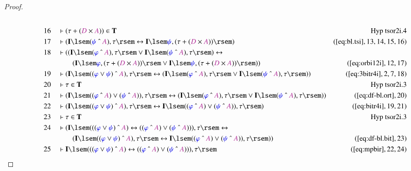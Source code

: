 \begin{proof}
\begin{align}
  \\ 16 &&  & \vdash ( \tau + ( \mc{D} \times \mc{A} ) ) \in
      \mathbf{T}&\text{Hyp~tsor2i.4}\notag%
  \\ 17 &&  & \vdash ( \mathbf{I} \lsem ( \mw{\psi} ~\string^~ \mc{A} ) , \tau
      \rsem \leftrightarrow \mathbf{I} \lsem \mw{\psi} , (
      \tau + ( \mc{D} \times \mc{A} ) ) \rsem
      )&(\mbox{\ref{eq:bl.tsi}},13,14,15,16)\notag
  \\ 18 &&  & \vdash ( ( \mathbf{I} \lsem ( \mw{\varphi} ~\string^~ \mc{A} ) ,
      \tau \rsem \vee \mathbf{I} \lsem ( \mw{\psi}
      ~\string^~ \mc{A} ) , \tau \rsem ) \leftrightarrow  \notag \\ & & & \qquad
     (
      \mathbf{I} \lsem \mw{\varphi} , ( \tau + ( \mc{D}
      \times \mc{A} ) ) \rsem \vee \mathbf{I} \lsem
      \mw{\psi} , ( \tau + ( \mc{D} \times \mc{A} ) ) \rsem
      ) )&(\mbox{\ref{eq:orbi12i}},12,17)\notag
  \\ 19 &&  & \vdash ( \mathbf{I} \lsem ( ( \mw{\varphi} \vee \mw{\psi} )
      ~\string^~ \mc{A} ) , \tau \rsem \leftrightarrow (
      \mathbf{I} \lsem ( \mw{\varphi} ~\string^~ \mc{A} ) ,
      \tau \rsem \vee \mathbf{I} \lsem ( \mw{\psi}
      ~\string^~ \mc{A} ) , \tau \rsem )
      )&(\mbox{\ref{eq:3bitr4i}},2,7,18)\notag
  \\ 20 &&  & \vdash \tau \in \mathbf{T}&\text{Hyp~tsor2i.3}\notag%
  \\ 21 &&  & \vdash ( \mathbf{I} \lsem ( ( \mw{\varphi} ~\string^~ \mc{A} )
      \vee ( \mw{\psi} ~\string^~ \mc{A} ) ) , \tau \rsem
      \leftrightarrow ( \mathbf{I} \lsem ( \mw{\varphi}
      ~\string^~ \mc{A} ) , \tau \rsem \vee \mathbf{I}
      \lsem ( \mw{\psi} ~\string^~ \mc{A} ) , \tau \rsem )
      )&(\mbox{\ref{eq:df-bl.ort}},20)\notag
  \\ 22 &&  & \vdash ( \mathbf{I} \lsem ( ( \mw{\varphi} \vee \mw{\psi} )
      ~\string^~ \mc{A} ) , \tau \rsem \leftrightarrow
      \mathbf{I} \lsem ( ( \mw{\varphi} ~\string^~ \mc{A} )
      \vee ( \mw{\psi} ~\string^~ \mc{A} ) ) , \tau \rsem
      )&(\mbox{\ref{eq:bitr4i}},19,21)\notag
  \\ 23 &&  & \vdash \tau \in \mathbf{T}&\text{Hyp~tsor2i.3}\notag%
  \\ 24 &&  & \vdash ( \mathbf{I} \lsem ( ( ( \mw{\varphi} \vee \mw{\psi} )
      ~\string^~ \mc{A} ) \leftrightarrow ( ( \mw{\varphi}
      ~\string^~ \mc{A} ) \vee ( \mw{\psi} ~\string^~
      \mc{A} ) ) ) , \tau \rsem \leftrightarrow \notag \\ & & & \qquad
      (
      \mathbf{I} \lsem ( ( \mw{\varphi} \vee \mw{\psi} )
      ~\string^~ \mc{A} ) , \tau \rsem \leftrightarrow
      \mathbf{I} \lsem ( ( \mw{\varphi} ~\string^~ \mc{A} )
      \vee ( \mw{\psi} ~\string^~ \mc{A} ) ) , \tau \rsem )
      )&(\mbox{\ref{eq:df-bl.bit}},23)\notag
  \\ 25 &&  & \vdash \mathbf{I} \lsem ( ( ( \mw{\varphi} \vee \mw{\psi} )
      ~\string^~ \mc{A} ) \leftrightarrow ( ( \mw{\varphi}
      ~\string^~ \mc{A} ) \vee ( \mw{\psi} ~\string^~
      \mc{A} ) ) ) , \tau
      \rsem&(\mbox{\ref{eq:mpbir}},22,24)\notag
\end{align}
\end{proof}

